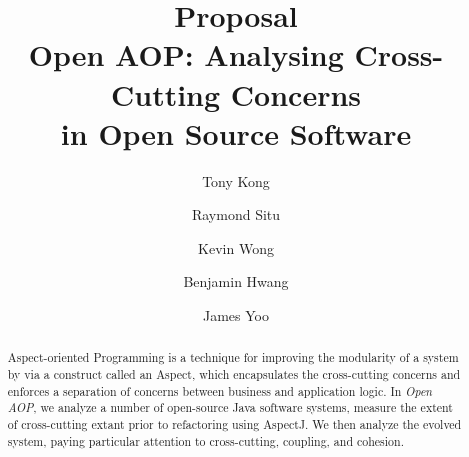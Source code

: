 \documentclass[sigconf]{acmart}
\begin{document}
\title{Proposal \protect\\ Open AOP: Analysing Cross-Cutting Concerns \protect\\ in Open Source Software}

\author{Tony Kong}

\author{Raymond Situ}

\author{Kevin Wong}

\author{Benjamin Hwang}

\author{James Yoo}

\begin{abstract}
Aspect-oriented Programming is a technique for improving the modularity of a system by via a construct called an Aspect, which encapsulates the cross-cutting concerns and enforces a separation of concerns between business and application logic. In \textit{Open AOP}, we analyze a number of open-source Java software systems, measure the extent of cross-cutting extant prior to refactoring using AspectJ. We then analyze the evolved system, paying particular attention to cross-cutting, coupling, and cohesion.  
\end{abstract}

\maketitle
\end{document}
